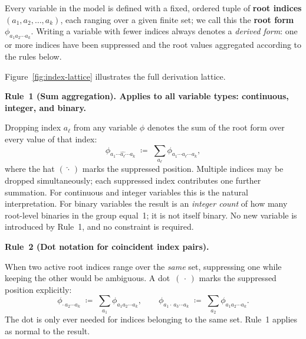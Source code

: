 \begin{convention}
\label{conv:notation}

Every variable in the model is defined with a fixed, ordered tuple of
\textbf{root indices} $(a_1, a_2, \dots, a_k)$, each ranging over a
given finite set; we call this the \textbf{root form}
$\phi_{a_1 a_2 \cdots a_k}$.
Writing a variable with fewer indices always denotes a
\emph{derived form}: one or more indices have been suppressed and the
root values aggregated according to the rules below.

Figure~\ref{fig:index-lattice} illustrates the full derivation lattice.

\medskip
\noindent\textbf{Rule~1 (Sum aggregation).
  Applies to all variable types: continuous, integer, and binary.}

Dropping index $a_\ell$ from any variable $\phi$ denotes the sum of
the root form over every value of that index:
%
\begin{equation*}
  \phi_{a_1 \cdots \widehat{a_\ell} \cdots a_k}
  \;\coloneqq\;
  \sum_{a_\ell} \phi_{a_1 \cdots a_\ell \cdots a_k},
\end{equation*}
%
where the hat $(\,\widehat{\cdot}\,)$ marks the suppressed position.
Multiple indices may be dropped simultaneously; each suppressed index
contributes one further summation.
For continuous and integer variables this is the natural interpretation.
For binary variables the result is an \emph{integer count} of how many
root-level binaries in the group equal~1; it is not itself binary.
No new variable is introduced by Rule~1, and no constraint is required.

\medskip
\noindent\textbf{Rule~2 (Dot notation for coincident index pairs).}

When two active root indices range over the \emph{same} set, suppressing
one while keeping the other would be ambiguous.
A dot~$(\,\cdot\,)$ marks the suppressed position explicitly:
%
\begin{equation*}
  \phi_{\cdot\, a_2 \cdots a_k}
  \;\coloneqq\;
  \sum_{a_1} \phi_{a_1 a_2 \cdots a_k},
  \qquad
  \phi_{a_1 \cdot\, a_3 \cdots a_k}
  \;\coloneqq\;
  \sum_{a_2} \phi_{a_1 a_2 \cdots a_k}.
\end{equation*}
%
The dot is only ever needed for indices belonging to the same set.
Rule~1 applies as normal to the result.


\end{convention}
